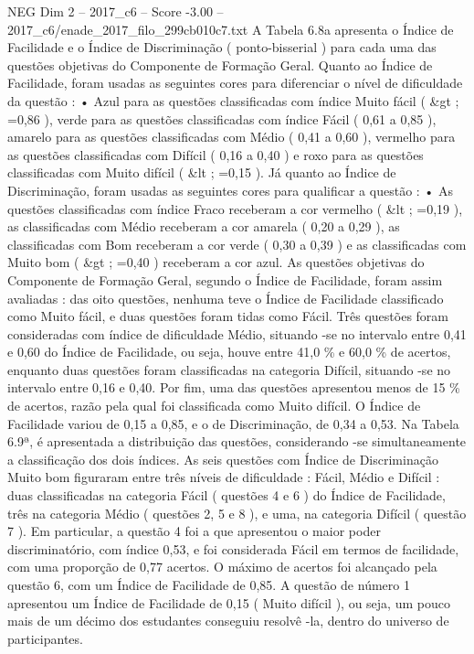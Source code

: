 \begin{textsample}{NEG Dim 2 – 2017\_c6 – Score -3.00 – 2017\_c6/enade\_2017\_filo\_299cb010c7.txt}
A Tabela 6.8a apresenta o Índice de Facilidade e o Índice de Discriminação ( ponto-bisserial ) para cada uma das questões objetivas do Componente de Formação Geral.
Quanto ao Índice de Facilidade, foram usadas as seguintes cores para diferenciar o nível de dificuldade da questão : • Azul para as questões classificadas com índice Muito fácil ( \&gt ; =0,86 ), verde para as questões classificadas com índice Fácil ( 0,61 a 0,85 ), amarelo para as questões classificadas com Médio ( 0,41 a 0,60 ), vermelho para as questões classificadas com Difícil ( 0,16 a 0,40 ) e roxo para as questões classificadas com Muito difícil ( \&lt ; =0,15 ).
Já quanto ao Índice de Discriminação, foram usadas as seguintes cores para qualificar a questão : • As questões classificadas com índice Fraco receberam a cor vermelho ( \&lt ; =0,19 ), as classificadas com Médio receberam a cor amarela ( 0,20 a 0,29 ), as classificadas com Bom receberam a cor verde ( 0,30 a 0,39 ) e as classificadas com Muito bom ( \&gt ; =0,40 ) receberam a cor azul.
As questões objetivas do Componente de Formação Geral, segundo o Índice de Facilidade, foram assim avaliadas : das oito questões, nenhuma teve o Índice de Facilidade classificado como Muito fácil, e duas questões foram tidas como Fácil.
Três questões foram consideradas com índice de dificuldade Médio, situando -se no intervalo entre 0,41 e 0,60 do Índice de Facilidade, ou seja, houve entre 41,0 \% e 60,0 \% de acertos, enquanto duas questões foram classificadas na categoria Difícil, situando -se no intervalo entre 0,16 e 0,40.
Por fim, uma das questões apresentou menos de 15 \% de acertos, razão pela qual foi classificada como Muito difícil.
O Índice de Facilidade variou de 0,15 a 0,85, e o de Discriminação, de 0,34 a 0,53.
Na Tabela 6.9ª, é apresentada a distribuição das questões, considerando -se simultaneamente a classificação dos dois índices.
As seis questões com Índice de Discriminação Muito bom figuraram entre três níveis de dificuldade : Fácil, Médio e Difícil : duas classificadas na categoria Fácil ( questões 4 e 6 ) do Índice de Facilidade, três na categoria Médio ( questões 2, 5 e 8 ), e uma, na categoria Difícil ( questão 7 ).
Em particular, a questão 4 foi a que apresentou o maior poder discriminatório, com índice 0,53, e foi considerada Fácil em termos de facilidade, com uma proporção de 0,77 acertos.
O máximo de acertos foi alcançado pela questão 6, com um Índice de Facilidade de 0,85.
A questão de número 1 apresentou um Índice de Facilidade de 0,15 ( Muito difícil ), ou seja, um pouco mais de um décimo dos estudantes conseguiu resolvê -la, dentro do universo de participantes.

\end{textsample}
